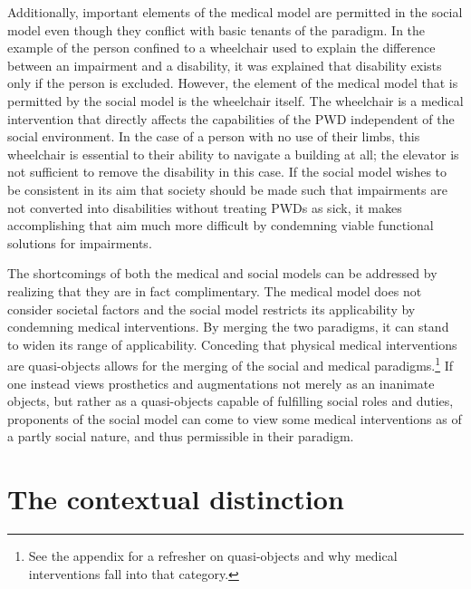 \documentclass[a4paper]{article}
\begin{document}
Additionally, important elements of the medical model are permitted in the
social model even though they conflict with basic tenants of the paradigm. In
the example of the person confined to a wheelchair used to explain the
difference between an impairment and a disability, it was explained that
disability exists only if the person is excluded. However, the element of the
medical model that is permitted by the social model is the wheelchair itself.
The wheelchair is a medical intervention that directly affects the
capabilities of the PWD independent of the social environment. In the case of
a person with no use of their limbs, this wheelchair is essential to their
ability to navigate a building at all; the elevator is not sufficient to
remove the disability in this case. If the social model wishes to be
consistent in its aim that society should be made such that impairments are
not converted into disabilities without treating PWDs as sick, it makes
accomplishing that aim much more difficult by condemning viable functional
solutions for impairments.

The shortcomings of both the medical and social models can be addressed by
realizing that they are in fact complimentary. The medical model does not
consider societal factors and the social model restricts its applicability by
condemning medical interventions. By merging the two paradigms, it can stand
to widen its range of applicability. Conceding that physical medical
interventions are  quasi-objects allows for the merging of the social and
medical paradigms.\footnote{See the appendix for a refresher on quasi-objects
and why medical interventions fall into that category.} If one instead views
prosthetics and augmentations not merely as an inanimate objects, but rather
as a quasi-objects capable of fulfilling social roles and duties, proponents
of the social model can come to view some medical interventions as of a partly
social nature, and thus permissible in their paradigm.

\newpage
\section{The contextual distinction}
\end{document}
